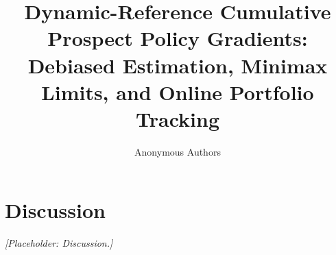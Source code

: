 \documentclass[11pt]{article}
\title{Dynamic-Reference Cumulative Prospect Policy Gradients:\\Debiased Estimation, Minimax Limits, and Online Portfolio Tracking}
\author{Anonymous Authors}
\date{}
\newcommand{\1}{\mathbf 1}
\newcommand{\placeholder}[1]{\par\noindent\textit{[Placeholder: #1]}\par}
\begin{document}
\maketitle











\section{Discussion}\label{sec:discussion}
\placeholder{Discussion.}




\clearpage
\appendix





\end{document}
